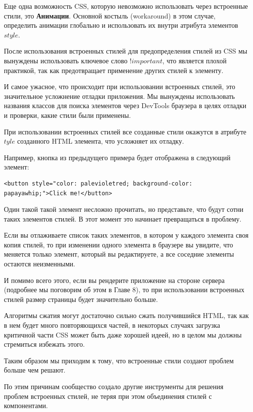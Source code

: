 Еще одна возможность CSS, которую невозможно использовать через встроенные стили, это \textbf{Анимации}. Основной костыль (workaround) в этом случае, определить анимации глобально и использовать их внутри атрибута элементов $style$.

После использования встроенных стилей для предопределения стилей из CSS мы вынуждены использовать ключевое слово $!important$, что является плохой практикой, так как предотвращает применение других стилей к элементу.

И самое ужасное, что происходит при использовании встроенных стилей, это значительное усложнение отладки приложения. Мы вынуждены использовать названия классов для поиска элементов через DevTools браузера в целях отладки и проверки, какие стили были применены.

При использовании встроенных стилей все созданные стили окажутся в атрибуте $tyle$ созданного HTML элемента, что усложняет их отладку.

Например, кнопка из предыдущего примера будет отображена в следующий элемент:

\begin{lstlisting}
<button style="color: palevioletred; background-color: papayawhip;">Click me!</button>
\end{lstlisting}

Один такой такой элемент несложно прочитать, но представьте, что будут сотни таких элементов стилей. В этот момент это начинает превращаться в проблему.

Если вы отлаживаете список таких элементов, в котором у каждого элемента своя копия стилей, то при изменении одного элемента в браузере вы увидите, что меняется только элемент, который вы редактируете, а все соседние элементы остаются неизменными. 

И помимо всего этого, если вы рендерите приложение на стороне сервера (подробнее мы поговорим об этом в Главе 8), то при использовании встроенных стилей размер страницы будет значительно больше. 

Алгоритмы сжатия могут достаточно сильно сжать получившийся HTML, так как в нем будет много повторяющихся частей, в некоторых случаях загрузка критичной части CSS может быть даже хорошей идеей, но в целом мы должны стремиться избежать этого.

Таким образом мы приходим к тому, что встроенные стили создают проблем больше чем решают.

По этим причинам сообщество создало другие инструменты для решения проблем встроенных стилей, не теряя при этом объединения стилей с компонентами. 

